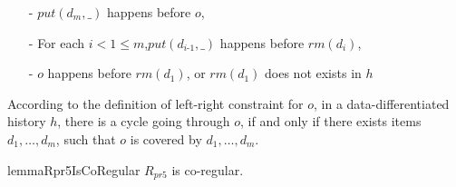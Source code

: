 \begin{itemize}
\setlength{\itemsep}{0.5pt}
\item[-] $\textit{put}(d_m,\_)$ happens before $o$,

\item[-] For each $i < 1 \leq m$,$\textit{put}(d_{\textit{i-1}},\_)$ happens before $\textit{rm}(d_i)$,

\item[-] $o$ happens before $\textit{rm}(d_1)$, or $\textit{rm}(d_1)$ does not exists in $h$
\end{itemize}

According to the definition of left-right constraint for $o$, in a data-differentiated history $h$, there is a cycle going through $o$, if and only if there exists items $d_1,\ldots,d_m$, such that $o$ is covered by $d_1,\ldots,d_m$.


\begin{restatable}{lemma}{Rpr5IsCoRegular}
\label{lemma:Rpr1 5s co-regular}
$R_{\textit{pr5}}$ is co-regular.
\end{restatable}

